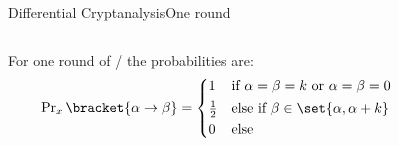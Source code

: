 \begin{frame}{Differential Cryptanalysis}{One round}
    \vspace{-30pt}
    \begin{columns}
        \begin{column}{0.58\textwidth}
            \centering
            \vspace{30pt}
            \begin{theorem}
                For one round of \bison/
                the probabilities are:
                \begin{equation*}
                    \Prob_x\bracket{\alpha \to \beta} = \begin{cases*}
                        1           & if $\alpha = \beta = k$ or $\alpha = \beta = 0$\\
                        \frac{1}{2} & else if $\beta \in \set{\alpha, \alpha + k}$\\
                        0           & else
                    \end{cases*}
                \end{equation*}
            \end{theorem}
        \end{column}
        \begin{column}{0.40\textwidth}
            \vspace{40pt}
            \centering
            \vfill
\end{column}
\end{columns}
\end{frame}
